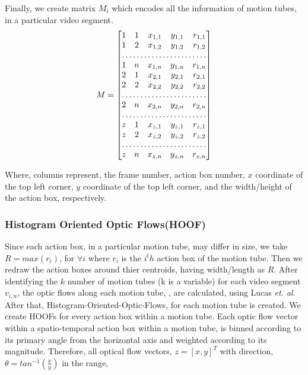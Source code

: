 Finally, we create matrix $M_{i}$ which encodes all the information of motion tubes, in a particular video segment.
\begin{equation}
M=\begin{bmatrix}
    1       & 1 & x_{1,1} & y_{1,1} & r_{1,1} \\
    1       & 2 & x_{1,2} & y_{1,2} & r_{1,2} \\
    \hdotsfor{5} \\
    1       & n & x_{1,n} & y_{1,n} & r_{1,n} \\
    2       & 1 & x_{2,1} & y_{2,1} & r_{2,1} \\
    2       & 2 & x_{2,2} & y_{2,2} & r_{2,2} \\
    \hdotsfor{5} \\
    2       & n & x_{2,n} & y_{2,n} & r_{2,n} \\
    \hdotsfor{5} \\
    z       & 1 & x_{z,1} & y_{z,1} & r_{z,1} \\
    z       & 2 & x_{z,2} & y_{z,2} & r_{z,2} \\
    \hdotsfor{5} \\
    z       & n & x_{z,n} & y_{z,n} & r_{z,n} \\
    
\end{bmatrix}
\end{equation}

Where, columns represent, the frame number, action box number, $x$ coordinate of the top left corner,
$y$ coordinate of the top left corner, and the width/height of the action box, respectively. 

\subsubsection{Histogram Oriented Optic Flows(HOOF)}
Since each action box, in a particular motion tube, may differ in size, we take $R = max(r_{i})$, for $\forall{i}$
where $r_{i}$ is the $i^th$ action box of the motion tube. Then we redraw the action boxes around thier centroids, having width/length as $R$.
After identifying the $k$ number of motion tubes (k is a variable) for each video segment $v_{i,n}$, the optic flows along each motion tube,
, are calculated, using Lucas \textit{et. al}.
After that, Histogram-Oriented-Optic-Flows, for each motion tube is created. We create HOOFs for every
action box within a motion tube. Each optic flow vector within a spatio-temporal action box within a motion tube, is binned according
to its primary angle from the horizontal axis and weighted according to its magnitude.  Therefore, all optical flow vectors, $z=[x,y]^T$ with direction,
$\theta = tan^{-1}(\frac{x}{y})$ in the range,

